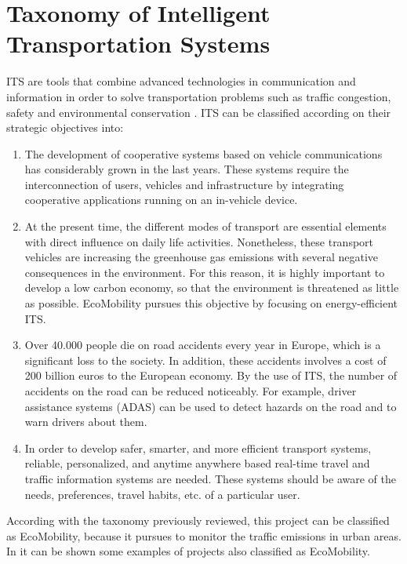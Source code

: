 \section{Taxonomy of Intelligent Transportation Systems}
\ac{ITS} are tools that combine advanced technologies in communication and information in order to solve transportation problems such as traffic congestion, safety and environmental conservation \cite{San15}. \ac{ITS} can be classified according on their strategic objectives \cite{Rafiq201345} into:
\begin{enumerate}
	\item {} The development of cooperative systems based on vehicle communications has considerably grown in the last years. These systems require the interconnection of users, vehicles and infrastructure by integrating cooperative applications running on an in-vehicle device.
	
	\item {} At the present time, the different modes of transport are essential elements with direct influence on daily life activities. Nonetheless, these transport vehicles are increasing the greenhouse gas emissions with several negative consequences in the environment. For this reason, it is highly important to develop a low carbon economy, so that the environment is threatened as little as possible. EcoMobility pursues this objective by focusing on energy-efficient \ac{ITS}.
	
	\item {} Over 40.000 people die on road accidents every year in Europe, which is a significant loss to the society. In addition, these accidents involves a cost of 200 billion euros to the European economy. By the use of \ac{ITS}, the number of accidents on the road can be reduced noticeably. For example, driver assistance systems (ADAS) can be used to detect hazards on the road and to warn drivers about them.
	
	\item {} In order to develop safer, smarter, and more efficient transport systems, reliable, personalized, and anytime anywhere based real-time travel and traffic information systems are needed. These systems should be aware of the needs, preferences, travel habits, etc. of a particular user.
\end{enumerate}

According with the taxonomy previously reviewed, this project can be classified as EcoMobility, because it pursues to monitor the traffic emissions in urban areas. In \cite{ADASIS,eCo-MOVe, NAVARRO2016314} it can be shown some examples of projects also classified as EcoMobility.

